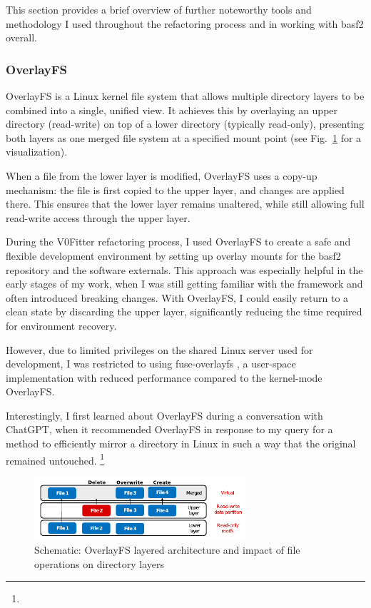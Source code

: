 This section provides a brief overview of further noteworthy tools and methodology I used throughout the refactoring process and in working with basf2 overall.

\subsubsection{OverlayFS}
OverlayFS \cite{overlayfs} is a Linux kernel file system that allows multiple directory layers to be combined into a single, unified view.
It achieves this by overlaying an upper directory (read-write) on top of a lower directory (typically read-only), presenting both layers as one merged file system at a specified mount point (see Fig.\ \ref{fig:overlayfs-schema} for a visualization).

When a file from the lower layer is modified, OverlayFS uses a copy-up mechanism: the file is first copied to the upper layer, and changes are applied there.
This ensures that the lower layer remains unaltered, while still allowing full read-write access through the upper layer.

During the V0Fitter refactoring process, I used OverlayFS to create a safe and flexible development environment by setting up overlay mounts for the basf2 repository and the software externals.
This approach was especially helpful in the early stages of my work, when I was still getting familiar with the framework and often introduced breaking changes.
With OverlayFS, I could easily return to a clean state by discarding the upper layer, significantly reducing the time required for environment recovery.

However, due to limited privileges on the shared Linux server used for development, I was restricted to using fuse-overlayfs \cite{fuse-overlayfs}, a user-space implementation with reduced performance compared to the kernel-mode OverlayFS.

Interestingly, I first learned about OverlayFS during a conversation with ChatGPT, when it recommended OverlayFS in response to my query for a method to efficiently mirror a directory in Linux in such a way that the original remained untouched.%
\footnote{}

\begin{figure}[h]
  \centering
  \includegraphics[width=0.7\textwidth]{static/overlayfs.pdf}
  \caption{Schematic: OverlayFS layered architecture and impact of file operations on directory layers \cite{overlayfs-schema}}
  \label{fig:overlayfs-schema}
\end{figure}

